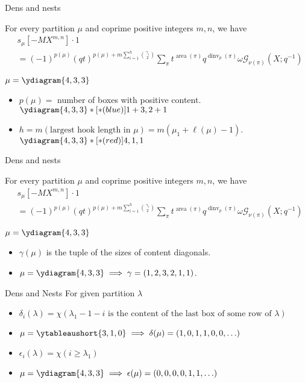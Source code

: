 \documentclass{beamer}
\DeclareMathOperator{\area}{area}
\DeclareMathOperator{\dinv}{dinv}
\newcommand{\Gcal}{\mathcal{G}}
\newcounter{c}
\begin{document}
\begin{frame}{Dens and nests}
  \begin{theorem}
    For every partition \(\mu\) and coprime positive integers \(m,n\),
    we have 
    \begin{align*}
      & s_\mu[-MX^{m,n}] \cdot 1 \\ & = (-1)^{p(\mu)}
      (qt)^{p(\mu)+m \sum_{i=1}^h \binom{\gamma_i}{2}}\sum_\pi t^{\area(\pi)}
      q^{\dinv_p(\pi)} \omega \Gcal_{\nu(\pi)}(X;q^{-1})
    \end{align*}
  \end{theorem}
  \(\mu = \ydiagram{4,3,3}\)\pause
  \begin{itemize}
  \item \(p(\mu) = \) number of boxes with positive content. \(\ydiagram{4,3,3}*[*(blue)]{1+3,2+1}\) \pause
  \item \(h = m (\text{largest hook length in }\mu) =
    m(\mu_1+\ell(\mu)-1)\). \(\ydiagram{4,3,3}*[*(red)]{4,1,1}\)\pause
  \end{itemize}
\end{frame}
\begin{frame}{Dens and nests}
  \begin{theorem}
    For every partition \(\mu\) and coprime positive integers \(m,n\),
    we have 
    \begin{align*}
      & s_\mu[-MX^{m,n}] \cdot 1 \\ & = (-1)^{p(\mu)}
      (qt)^{p(\mu)+m \sum_{i=1}^h \binom{\gamma_i}{2}}\sum_\pi t^{\area(\pi)}
      q^{\dinv_p(\pi)} \omega \Gcal_{\nu(\pi)}(X;q^{-1})
    \end{align*}
  \end{theorem}
  \(\mu = \ydiagram{4,3,3}\)
  \begin{itemize}
  \item \(\gamma(\mu)\) is the tuple of the sizes of content diagonals.\pause 
  \item \(\mu=\ydiagram{4,3,3} \implies \gamma=(1,2,3,2,1,1)\).
  \end{itemize}
\end{frame}
\begin{frame}{Dens and Nests}
  For given partition \(\lambda\)
  \begin{itemize}
  \item \(\delta_i(\lambda) = \chi(\lambda_1-1-i \text{ is the content
    of the last box of some row of }\lambda)\)  \pause
  \item \(\mu = \ytableaushort{{}{}{}3,{}{}1,{}{}0} \implies \delta(\mu) =
    (1,0,1,1,0,0,\ldots)\) \pause
  \item \(\epsilon_i(\lambda) = \chi(i \geq \lambda_1)\) \pause
  \item \(\mu = \ydiagram{4,3,3} \implies \epsilon(\mu) = (0,0,0,0,1,1,\ldots)\)
  \end{itemize}
\end{frame}
\end{document}

